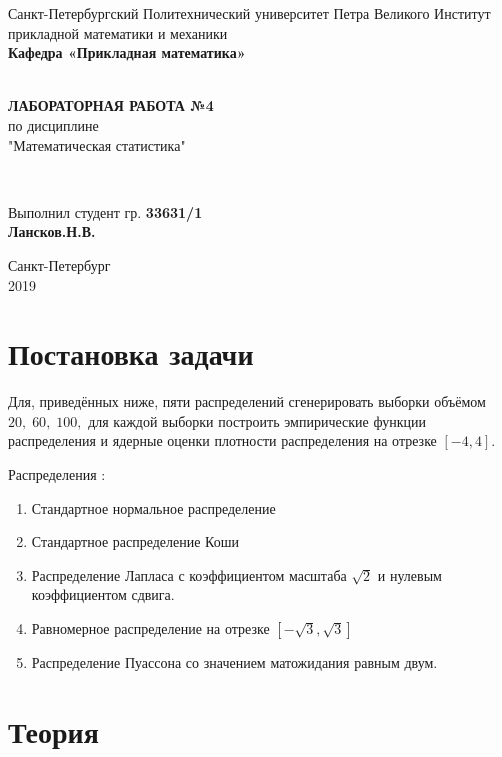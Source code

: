 \documentclass[12pt]{article}
\renewcommand{\listoffigures}{\begingroup  %
\tocsection
\tocfile{\listfigurename}{lof}
\endgroup}
\renewcommand{\listoftables}{\begingroup  %
\tocsection
\tocfile{\listtablename}{lot}
\endgroup}
\begin{document}
\begin{titlepage}
	\center
		Санкт-Петербургский Политехнический 
		университет Петра Великого
		Институт прикладной математики и механики
		\\ \textbf{Кафедра «Прикладная математика»}

	\vfill ~
	\textbf{
		\\ \large ЛАБОРАТОРНАЯ РАБОТА №4
	}
	\\	по дисциплине 
	\\	"Математическая статистика"

	\vfill ~

	Выполнил студент гр. \textbf{33631/1} \\
	\textbf{Лансков.Н.В.} \\ 

\vfill

{\large}	Санкт-Петербург
\\ 2019
\end{titlepage}


\tableofcontents 
\newpage
\listoffigures
\newpage

\section{Постановка задачи}

Для, приведённых ниже, пяти распределений сгенерировать выборки объёмом $20,\; 60,\; 100,$ для каждой выборки построить эмпирические функции распределения и ядерные оценки плотности распределения на отрезке $[-4, 4].$

Распределения \cite{distr_formulas}:
\begin{enumerate}
\item Стандартное нормальное распределение
\item Стандартное распределение Коши
\item Распределение Лапласа с коэффициентом масштаба $\sqrt{2}$ и нулевым коэффициентом сдвига.
\item Равномерное распределение на отрезке $\left[-\sqrt{3}, \sqrt{3}\right]$
\item Распределение Пуассона со значением матожидания равным двум.
\end{enumerate}

\section{Теория}
\end{document}

